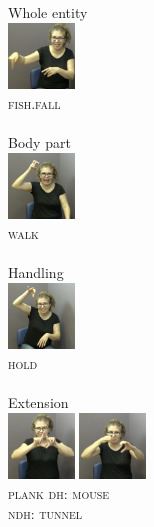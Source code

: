 \documentclass[review]{elsarticle} %
\begin{document}
\begin{multicols}{4}
\begin{exe}
\ex \label{ex:8}
\begin{xlist}
\ex Whole entity \\\glll 
\includegraphics[width=50pt]{pictures/3e.png} \\ \textsc{fish.fall}\\ \\
\ex Body part \\\glll
\includegraphics[width=50pt]{pictures/3b.png} \\ \textsc{walk} \\ \\ 
\ex Handling \\\glll 
\includegraphics[width=50pt]{pictures/3c.png} \\ \textsc{hold} \\ \\
\ex Extension \\\glll 
\includegraphics[width=50pt]{pictures/3d_1.png} \includegraphics[width=50pt]{pictures/3a.png}\\ \textsc{plank} {\textsc{dh: mouse}} \\ {} {\textsc{ndh: tunnel}}\\ \\
\end{xlist}
\end{exe}
\end{multicols}
\end{document}

